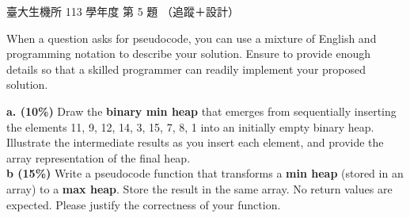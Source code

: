 \begin{pastexam}[label={px:ntu-113-bme-ds-05}]{臺大生機所 113 學年度 第 5 題}
（追蹤＋設計）

When a question asks for pseudocode, you can use a mixture of English and programming notation to
describe your solution. Ensure to provide enough details so that a skilled programmer can readily
implement your proposed solution.

\textbf{a. (10\%)} Draw the \textbf{binary min heap} that emerges from sequentially inserting the
elements 11, 9, 12, 14, 3, 15, 7, 8, 1 into an initially empty binary heap. Illustrate the
intermediate results as you insert each element, and provide the array representation of the final
heap.\\
\textbf{b (15\%)} Write a pseudocode function that transforms a \textbf{min heap} (stored in an array)
to a \textbf{max heap}. Store the result in the same array. No return values are expected. Please
justify the correctness of your function.
\end{pastexam}

